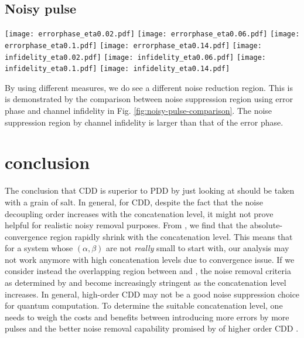 \documentclass[aps,pra,reprint,superscriptaddress]{revtex4-2}
\begin{document}
\subsection{Noisy pulse}
\begin{figure*}[ht!]
    \centering
    \texttt{[image: errorphase\_eta0.02.pdf]}
    \texttt{[image: errorphase\_eta0.06.pdf]}
    \texttt{[image: errorphase\_eta0.1.pdf]}
    \texttt{[image: errorphase\_eta0.14.pdf]}
    \texttt{[image: infidelity\_eta0.02.pdf]}
    \texttt{[image: infidelity\_eta0.06.pdf]}
    \texttt{[image: infidelity\_eta0.1.pdf]}
    \texttt{[image: infidelity\_eta0.14.pdf]}
    \caption{Top panels: reproduction of the error phase results in Fig. \ref{fig:npdd-reg-tho}. Bottom panels: Noise reduction region using channel infidelity. The strength of noise in the pulse $\theta = 0.02,~0.06,~0.1,~0.14$ from left to right. } 
    \label{fig:noisy-pulse-comparison}
\end{figure*}

By using different measures, we do see a different noise reduction region. This is is demonstrated by the comparison between noise suppression region using error phase and channel infidelity in Fig. \ref{fig:noisy-pulse-comparison}. The noise suppression region by channel infidelity is larger than that of the error phase.







\section{conclusion}
The conclusion that CDD is superior to PDD by just looking at  should be taken with a grain of salt. 
In general, for CDD,  despite the fact that the
noise decoupling order increases with the concatenation level,
it might not prove helpful for realistic noisy removal purposes. 
From , we find that the absolute-convergence region rapidly shrink with the concatenation level. This means that for a system whose $(\alpha,\beta)$ are not \emph{really} small to start with, our analysis may not work anymore with high concatenation levels due to convergence issue. 
If we consider instead the overlapping region between  and , the
noise removal criteria as determined by  and  become increasingly stringent as the concatenation level increases.  
In general, high-order CDD may not be a good noise suppression choice for quantum computation. To determine the suitable concatenation level, one needs to weigh the costs and benefits between introducing more errors by more pulses and the better noise removal capability promised by of higher order CDD .
\end{document}
